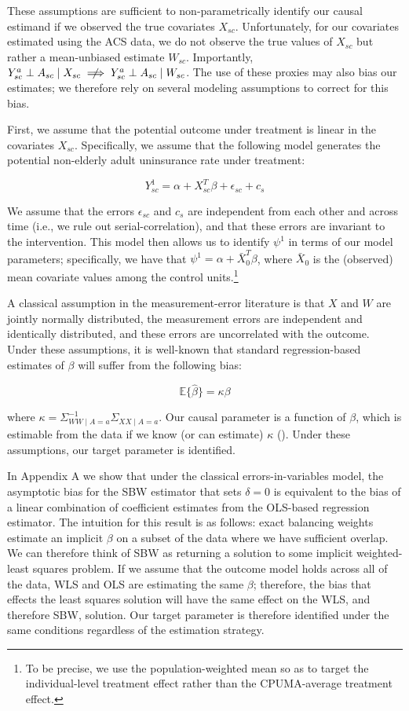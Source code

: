 \documentclass{article}
\begin{document}
These assumptions are sufficient to non-parametrically identify our causal estimand if we observed the true covariates $X_{sc}$. Unfortunately, for our covariates estimated using the ACS data, we do not observe the true values of $X_{sc}$ but rather a mean-unbiased estimate $W_{sc}$. Importantly, $Y_{sc}^a \perp A_{sc} \mid X_{sc} \centernot\implies Y_{sc}^a \perp A_{sc} \mid W_{sc}$. The use of these proxies may also bias our estimates; we therefore rely on several modeling assumptions to correct for this bias.

First, we assume that the potential outcome under treatment is linear in the covariates $X_{sc}$. Specifically, we assume that the following model generates the potential non-elderly adult uninsurance rate under treatment:

$$
Y_{sc}^1 = \alpha + X_{sc}^T\beta + \epsilon_{sc} + c_s
$$

We assume that the errors $\epsilon_{sc}$ and $c_s$ are independent from each other and across time (i.e., we rule out serial-correlation), and that these errors are invariant to the intervention. This model then allows us to identify $\psi^1$ in terms of our model parameters; specifically, we have that $\psi^1 = \alpha + \bar{X}_0^T\beta$, where $\bar{X}_0$ is the (observed) mean covariate values among the control units.\footnote{To be precise, we use the population-weighted mean so as to target the individual-level treatment effect rather than the CPUMA-average treatment effect.} 

A classical assumption in the measurement-error literature is that $X$ and $W$ are jointly normally distributed, the measurement errors are independent and identically distributed, and these errors are uncorrelated with the outcome. Under these assumptions, it is well-known that standard regression-based estimates of $\beta$ will suffer from the following bias:

$$
\mathbb{E}\{\hat{\beta}\} = \kappa \beta
$$

where $\kappa = \Sigma_{WW \mid A = a}^{-1}\Sigma_{XX \mid A = a}$. Our causal parameter is a function of $\beta$, which is estimable from the data if we know (or can estimate) $\kappa$ (\cite{gleser1992importance}). Under these assumptions, our target parameter is identified.

In Appendix A we show that under the classical errors-in-variables model, the asymptotic bias for the SBW estimator that sets $\delta = 0$ is equivalent to the bias of a linear combination of coefficient estimates from the OLS-based regression estimator. The intuition for this result is as follows: exact balancing weights estimate an implicit $\beta$ on a subset of the data where we have sufficient overlap. We can therefore think of SBW as returning a solution to some implicit weighted-least squares problem. If we assume that the outcome model holds across all of the data, WLS and OLS are estimating the same $\beta$; therefore, the bias that effects the least squares solution will have the same effect on the WLS, and therefore SBW, solution. Our target parameter is therefore identified under the same conditions regardless of the estimation strategy.
\end{document}
